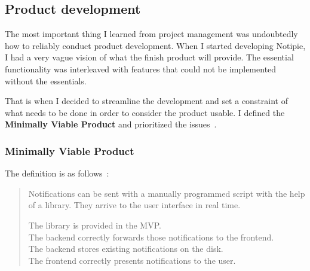 \subsection{Product development}\label{product-development}

The most important thing I learned from project management was undoubtedly
how to reliably conduct product development.
When I started developing Notipie,
I had a very vague vision of what the finish product will provide.
The essential functionality was interleaved with features
that could not be implemented without the essentials.

That is when I decided to streamline the development
and set a constraint of what needs to be done
in order to consider the product usable.
I defined the \textbf{Minimally Viable Product}
and prioritized the issues~\cite{sewera_issues_2022}.

\subsubsection{Minimally Viable Product}\label{minimally-viable-product}

The definition is as follows~\cite{sewera_mvp_2022}:

\begin{quote}
  Notifications can be sent with a manually programmed script
  with the help of a library.
  They arrive to the user interface in real time.

  The library is provided in the MVP.\\
  The backend correctly forwards those notifications to the frontend.\\
  The backend stores existing notifications on the disk.\\
  The frontend correctly presents notifications to the user.
\end{quote}
